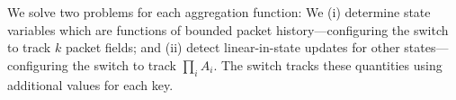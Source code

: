 
We solve two problems for each aggregation function: We (i) determine state
variables which are functions of bounded packet history---configuring the switch
to track $k$ packet fields; and (ii) detect linear-in-state updates for other
states---configuring the switch to track $\prod_{i} A_i$. The switch tracks
these quantities using additional values for each key.





